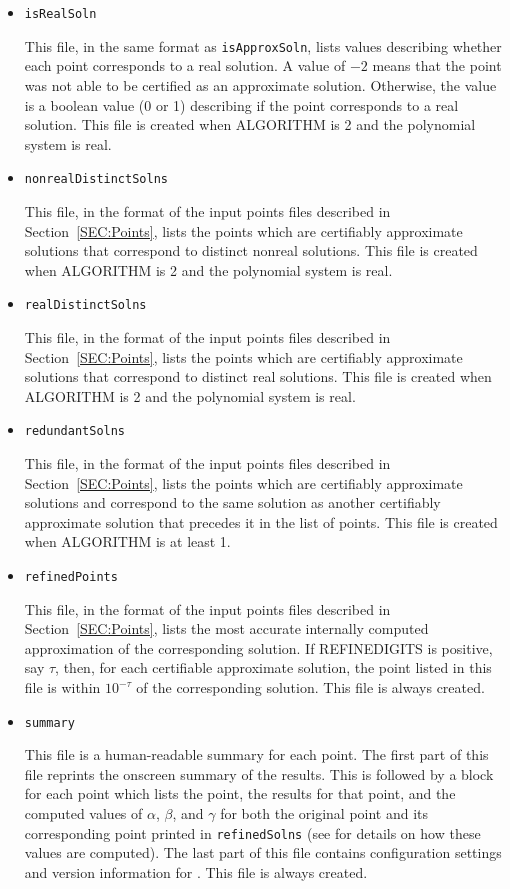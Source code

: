 \documentclass[11pt]{report}
\begin{document}
\begin{itemize}
\item {\tt isRealSoln}

This file, in the same format as {\tt isApproxSoln}, lists values describing whether
each point corresponds to a real solution.  A value of $-2$ means that the point
was not able to be certified as an approximate solution.  Otherwise,
the value is a boolean value (0 or 1) describing if the point corresponds to a real solution.
This file is created when ALGORITHM
is 2 and the polynomial system is real.

\item {\tt nonrealDistinctSolns}

This file, in the format of the input points files described in Section~\ref{SEC:Points},
lists the points which are certifiably approximate solutions that correspond to distinct
nonreal solutions.  This file is created when ALGORITHM is 2 and the polynomial system is real.

\item {\tt realDistinctSolns}

This file, in the format of the input points files described in Section~\ref{SEC:Points},
lists the points which are certifiably approximate solutions that correspond to distinct
real solutions.  This file is created when ALGORITHM is 2 and the polynomial system is real.

\item {\tt redundantSolns}

This file, in the format of the input points files described in Section~\ref{SEC:Points},
lists the points which are certifiably approximate solutions and correspond
to the same solution as another certifiably approximate solution that precedes
it in the list of points.  This file is created when ALGORITHM is at least 1.

\item {\tt refinedPoints}

This file, in the format of the input points files described in Section~\ref{SEC:Points},
lists the most accurate internally computed approximation of the corresponding solution.
If REFINEDIGITS is positive, say $\tau$, then, for each certifiable approximate solution,
the point listed in this file is within $10^{-\tau}$ of the corresponding solution.
This file is always created.

\item {\tt summary}

This file is a human-readable summary for each point.  The first part of this file
reprints the onscreen summary of the results.  This is followed by a block for each
point which lists the point, the results for that point, and the
computed values of $\alpha$, $\beta$, and $\gamma$ for both the original point and its
corresponding point printed in {\tt refinedSolns} (see \cite{HS10} for details on how these values are computed).
The last part of this file contains configuration settings and version information for \alphaCertified.
This file is always created.


\end{itemize}
\end{document}
